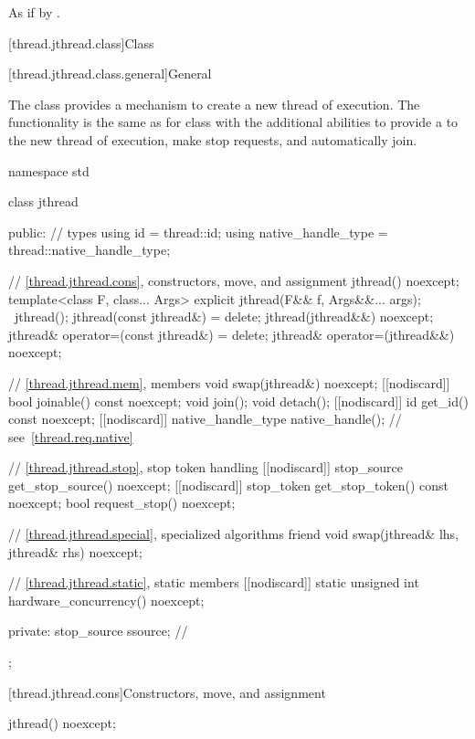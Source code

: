 \begin{itemdescr}
\pnum
\effects
As if by .
\end{itemdescr}

[thread.jthread.class]{Class }

[thread.jthread.class.general]{General}

\pnum
The class  provides a mechanism
to create a new thread of execution.
The functionality is the same as for
class 
with the additional abilities to provide
a  to the new thread of execution,
make stop requests, and automatically join.

%
\begin{codeblock}
namespace std {
  class jthread {
  public:
    // types
    using id = thread::id;
    using native_handle_type = thread::native_handle_type;

    // \ref{thread.jthread.cons}, constructors, move, and assignment
    jthread() noexcept;
    template<class F, class... Args> explicit jthread(F&& f, Args&&... args);
    ~jthread();
    jthread(const jthread&) = delete;
    jthread(jthread&&) noexcept;
    jthread& operator=(const jthread&) = delete;
    jthread& operator=(jthread&&) noexcept;

    // \ref{thread.jthread.mem}, members
    void swap(jthread&) noexcept;
    [[nodiscard]] bool joinable() const noexcept;
    void join();
    void detach();
    [[nodiscard]] id get_id() const noexcept;
    [[nodiscard]] native_handle_type native_handle();   // see~\ref{thread.req.native}

    // \ref{thread.jthread.stop}, stop token handling
    [[nodiscard]] stop_source get_stop_source() noexcept;
    [[nodiscard]] stop_token get_stop_token() const noexcept;
    bool request_stop() noexcept;

    // \ref{thread.jthread.special}, specialized algorithms
    friend void swap(jthread& lhs, jthread& rhs) noexcept;

    // \ref{thread.jthread.static}, static members
    [[nodiscard]] static unsigned int hardware_concurrency() noexcept;

  private:
    stop_source ssource;        // \expos
  };
}
\end{codeblock}

[thread.jthread.cons]{Constructors, move, and assignment}

%
\begin{itemdecl}
jthread() noexcept;
\end{itemdecl}

